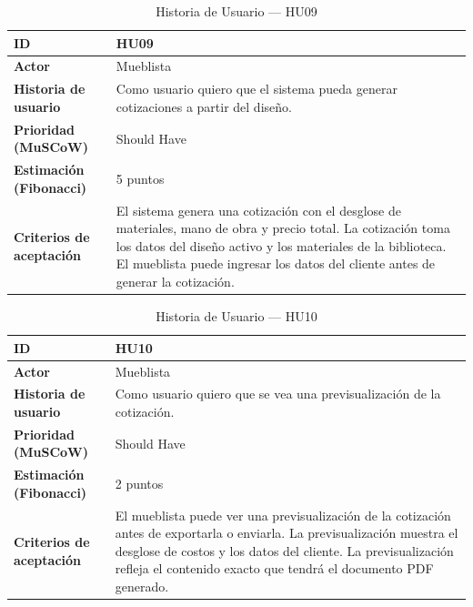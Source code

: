 ﻿\documentclass{iccmemoria}
\begin{document}
\begin{table}[H]
\centering
\caption{Historia de Usuario — HU09}
\begin{tabular}{|p{4.5cm}|p{9.5cm}|}
\hline
\textbf{ID} & HU09 \\
\hline
\textbf{Actor} & Mueblista \\
\hline
\textbf{Historia de usuario} & Como usuario quiero que el sistema pueda generar cotizaciones a partir del diseño. \\
\hline
\textbf{Prioridad (MuSCoW)} & Should Have \\
\hline
\textbf{Estimación (Fibonacci)} & 5 puntos \\
\hline
\textbf{Criterios de aceptación} & El sistema genera una cotización con el desglose de materiales, mano de obra y precio total.\newline
La cotización toma los datos del diseño activo y los materiales de la biblioteca.\newline
El mueblista puede ingresar los datos del cliente antes de generar la cotización. \\
\hline
\end{tabular}
\end{table}

\begin{table}[H]
\centering
\caption{Historia de Usuario — HU10}
\begin{tabular}{|p{4.5cm}|p{9.5cm}|}
\hline
\textbf{ID} & HU10 \\
\hline
\textbf{Actor} & Mueblista \\
\hline
\textbf{Historia de usuario} & Como usuario quiero que se vea una previsualización de la cotización. \\
\hline
\textbf{Prioridad (MuSCoW)} & Should Have \\
\hline
\textbf{Estimación (Fibonacci)} & 2 puntos \\
\hline
\textbf{Criterios de aceptación} & El mueblista puede ver una previsualización de la cotización antes de exportarla o enviarla.\newline
La previsualización muestra el desglose de costos y los datos del cliente.\newline
La previsualización refleja el contenido exacto que tendrá el documento PDF generado. \\
\hline
\end{tabular}
\end{table}
\end{document}
